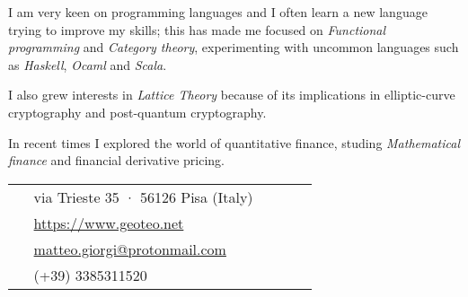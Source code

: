 \documentclass[10pt]{article} %
\begin{document}
\begin{paracol}{2}
I am very keen on programming languages and I often learn a new language trying to improve my skills; this has made me focused on \textit{Functional programming} and \textit{Category theory}, experimenting with uncommon languages such as \textit{Haskell}, \textit{Ocaml} and \textit{Scala}.

\medskip
I also grew interests in \textit{Lattice Theory} because of its implications in elliptic-curve cryptography and post-quantum cryptography.

\medskip
In recent times I explored the world of quantitative finance, studing \textit{Mathematical finance} and financial derivative pricing.





\switchcolumn %


\parbox[top][0.12\textheight][c]{\linewidth}{ %
	\vspace{-0.04\textheight} %
	\colorbox{shade}{ %
		\begin{supertabular}{p{0.05\linewidth}|p{0.775\linewidth}} %
			\raisebox{-1pt}{\faHome} & via Trieste 35 · 56126 Pisa (Italy) \\ %
			\raisebox{-1pt}{\small\faDesktop} & \href{https://www.geoteo.net}{https://www.geoteo.net} \\ %
			\raisebox{0pt}{\small\faEnvelope} & \href{mailto:matteo.giorgi@protonmail.com}{matteo.giorgi@protonmail.com} \\ %
			\raisebox{-1pt}{\faPhoneSquare} & (+39) 3385311520 \\ %
		\end{supertabular}
	}
}


\end{paracol}
\end{document}
